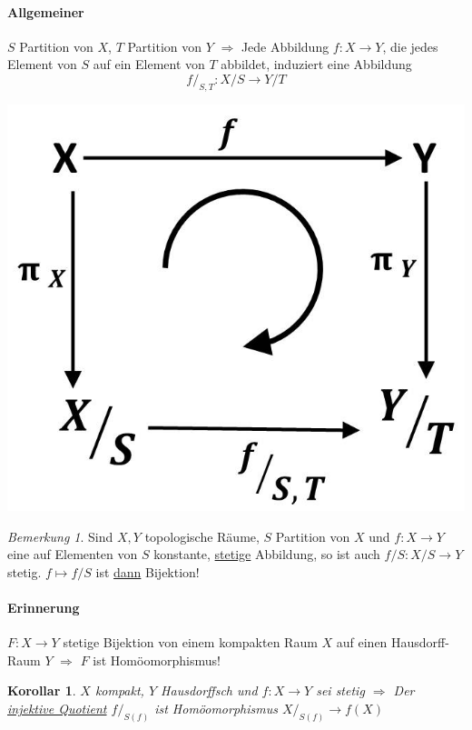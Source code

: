 \documentclass[a4paper,11pt,notitlepage]{report}
\newtheorem{corollary}{Korollar}[chapter]
\theoremstyle{remark}
\newtheorem{remark}{Bemerkung}[chapter]
\theoremstyle{definition}
\begin{document}
\paragraph{Allgemeiner}
$S$ Partition von $X$, $T$ Partition von $Y$
\newline
$\Rightarrow$ Jede Abbildung $f \colon X \rightarrow Y$, die jedes Element von $S$ auf ein Element von $T$ abbildet, induziert eine Abbildung 
$$f/_{S,T} \colon X/S \rightarrow Y/T$$
\begin{center}
	\includegraphics[scale=0.4]{images/f_modulo_S_T_Diagramm.jpg}
\end{center}

\begin{remark}
	Sind $X,Y$ topologische Räume, $S$ Partition von $X$ und $f \colon X \rightarrow Y$ eine auf Elementen von $S$ konstante, \underline{stetige} Abbildung, so ist auch $f/S \colon X/S \rightarrow Y$ stetig.
	\newline
	$f \mapsto f/S$ ist \underline{dann} Bijektion! 
\end{remark}

\paragraph{Erinnerung}
$F \colon X \rightarrow Y$ stetige Bijektion von einem kompakten Raum $X$ auf einen Hausdorff-Raum $Y$ $\Rightarrow$ $F$ ist Homöomorphismus!

\begin{corollary}
	$X$ kompakt, $Y$ Hausdorffsch und $f \colon X \rightarrow Y$ sei stetig 
	$\Rightarrow$ Der \underline{injektive Quotient} $f/_{S(f)}$ ist Homöomorphismus $X/_{S(f)} \rightarrow f(X)$
\end{corollary}
\end{document}
